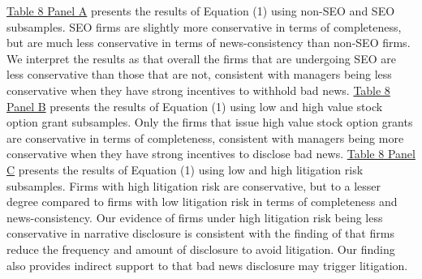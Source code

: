 \documentclass[letterpaper,12pt]{article}
\begin{document}
\begin{spacing}{1.5}
\hyperref[T8]{Table 8 Panel A} presents the results of Equation (1) using non-SEO and SEO subsamples. SEO firms are slightly more conservative in terms of completeness, but are much less conservative in terms of news-consistency than non-SEO firms. We interpret the results as that overall the firms that are undergoing SEO are less conservative than those that are not, consistent with managers being less conservative when they have strong incentives to withhold bad news. \hyperref[T8]{Table 8 Panel B} presents the results of Equation (1) using low and high value stock option grant subsamples. Only the firms that issue high value stock option grants are conservative in terms of completeness, consistent with managers being more conservative when they have strong incentives to disclose bad news. \hyperref[T8]{Table 8 Panel C} presents the results of Equation (1) using low and high litigation risk subsamples. Firms with high litigation risk are conservative, but to a lesser degree compared to firms with low litigation risk in terms of completeness and news-consistency. Our evidence of firms under high litigation risk being less conservative in narrative disclosure is consistent with the finding of  that firms reduce the frequency and amount of disclosure to avoid litigation. Our finding also provides indirect support to  that bad news disclosure may trigger litigation.

\begin{comment}
\subsection{Bundling}
Using 8-K filings from 2005 to 2013, \citeA{segalAreManagersStrategic2016} find that managers strategically report negative news after trading hours when they believe that investor attention is low, and that firms bundle good and bad news disclosure to mitigate the negative impact of the latter. Consistent with \citeA{segalAreManagersStrategic2016}, \citeA{niessnerStrategicDisclosureTiming2015} find that managers systematically disclose bad news when investors are more distracted, and that this strategic disclosure of bad news is often accompanied with insider trading and earnings management. In sum, strategic delay or timing of bad news disclosure distorts the market and brings undesirable economic consequences.
\end{comment}


\end{spacing}
\end{document}
